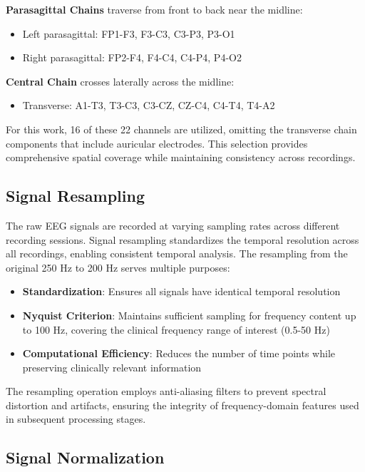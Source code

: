 \textbf{Parasagittal Chains} traverse from front to back near the midline:
\begin{itemize}
    \item Left parasagittal: FP1-F3, F3-C3, C3-P3, P3-O1
    \item Right parasagittal: FP2-F4, F4-C4, C4-P4, P4-O2
\end{itemize}

\textbf{Central Chain} crosses laterally across the midline:
\begin{itemize}
    \item Transverse: A1-T3, T3-C3, C3-CZ, CZ-C4, C4-T4, T4-A2
\end{itemize}

For this work, 16 of these 22 channels are utilized, omitting the transverse chain components that include auricular electrodes. This selection provides comprehensive spatial coverage while maintaining consistency across recordings.

\subsection{Signal Resampling}
\label{sec:signal_resampling}

The raw \ac{EEG} signals are recorded at varying sampling rates across different recording sessions. Signal resampling standardizes the temporal resolution across all recordings, enabling consistent temporal analysis. The resampling from the original 250 Hz to 200 Hz serves multiple purposes:

\begin{itemize}
    \item \textbf{Standardization}: Ensures all signals have identical temporal resolution
    \item \textbf{Nyquist Criterion}: Maintains sufficient sampling for frequency content up to 100 Hz, covering the clinical frequency range of interest (0.5-50 Hz)
    \item \textbf{Computational Efficiency}: Reduces the number of time points while preserving clinically relevant information
\end{itemize}

The resampling operation employs anti-aliasing filters to prevent spectral distortion and artifacts, ensuring the integrity of frequency-domain features used in subsequent processing stages.

\subsection{Signal Normalization}
\label{sec:signal_normalization}

